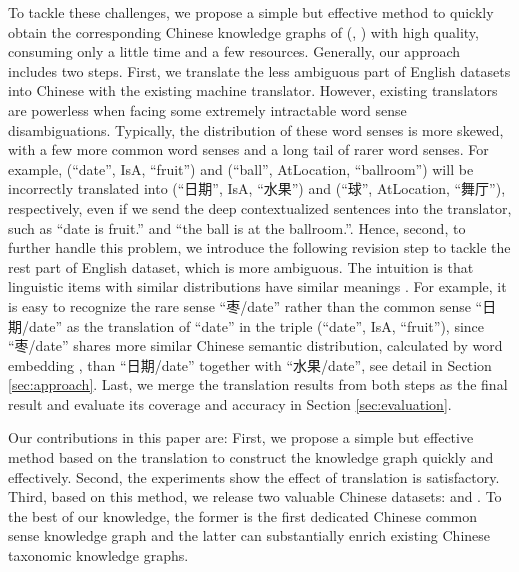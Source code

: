To tackle these challenges, we propose a simple but effective method to quickly obtain the corresponding Chinese knowledge graphs of (\pro, \con) with high quality, consuming only a little time and a few resources.
Generally, our approach includes two steps. First, we translate the less ambiguous part of English datasets into Chinese with the existing machine translator.  
However, existing translators are powerless when facing some extremely intractable word sense disambiguations. Typically, the distribution of these word senses is more skewed, with a few more common word senses and a long tail of rarer word senses. For example, (``date'', IsA, ``fruit'') and (``ball'', AtLocation, ``ballroom'') will be incorrectly translated into (``日期'', IsA, ``水果'') and (``球'', AtLocation, ``舞厅''), respectively, even if we send the deep contextualized sentences into the translator, such as ``date is fruit.'' and ``the ball is at the ballroom.''. 
Hence, second, to further handle this problem, we introduce the following revision step to tackle the rest part of English dataset, which is more ambiguous.
The intuition is that linguistic items with similar distributions have similar meanings \cite{harris1954distri}.
For example, it is easy to recognize the rare sense ``枣/date'' rather than the common sense ``日期/date'' as the translation of ``date'' in the triple (``date'', IsA, ``fruit''), since ``枣/date'' shares more similar Chinese semantic distribution, calculated by word embedding \cite{Mikolov_nips_2013}, than ``日期/date'' together with ``水果/date'', see detail in Section \ref{sec:approach}. 
Last, we merge the translation results from both steps as the final result and evaluate its coverage and accuracy in Section \ref{sec:evaluation}.

Our contributions in this paper are: First, we propose a simple but effective method based on the translation to construct the knowledge graph quickly and effectively. Second, the experiments show the effect of translation is satisfactory. Third, based on this method, we release two valuable Chinese datasets: \zhcon and \zhpro. To the best of our knowledge, the former is the first dedicated Chinese common sense knowledge graph and the latter can substantially enrich existing Chinese taxonomic knowledge graphs. 
